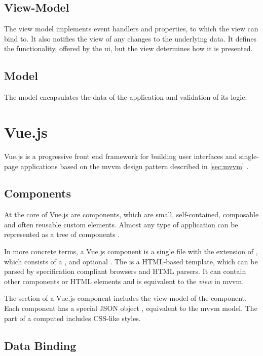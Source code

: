\subsection{View-Model}
The view model implements event handlers and properties, to which the view can bind to. It also notifies the view of any changes to the underlying data. It defines the functionality, offered by the \gls{ui}, but the view determines how it is presented. 
\subsection{Model}
The model encapsulates the data of the application and validation of its logic.


\section{Vue.js}

Vue.js \parencite{vuejs_gh} is a progressive front end framework for building user interfaces and single-page applications based on the \gls{mvvm} design pattern described in \ref{sec:mvvm} \parencite{vuejs_book} \parencite{vuejs_guide}.  

\subsection{Components}
At the core of Vue.js are components, which are small, self-contained, composable and often reusable custom elements. Almost any type of application can be represented as a tree of components \parencite{vuejs_guide}. 

In more concrete terms, a Vue.js component is a single file with the extension of , which consists of a ,  and optional . The  is a HTML-based template, which can be parsed by specification compliant browsers and HTML parsers. It can contain other components or HTML elements and is equivalent to the \textit{view} in \gls{mvvm}. 

The  section of a Vue.js component includes the view-model of the component. Each component has a special JSON object , equivalent to the \gls{mvvm} model.
The  part of a computed includes CSS-like styles.

\subsection{Data Binding}

